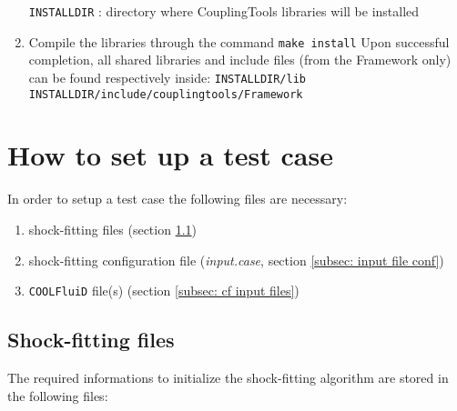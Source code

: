 \documentclass[11pt,a4paper,oneside]{article}
\begin{document}
\begin{enumerate}
{\hspace*{1cm} \texttt{INSTALLDIR} : directory where CouplingTools libraries will be installed
}
\item
{
Compile the libraries through the command
\newline
\newline
\hspace*{1cm} \texttt{make install}
\newline
\newline
Upon successful completion, all shared libraries and include files (from the Framework only) can be found respectively inside:
\newline
\newline
\hspace*{1cm} \texttt{INSTALLDIR/lib  \quad INSTALLDIR/include/couplingtools/Framework}
}
\end{enumerate}

\section{How to set up a test case}
\label{sec:setup test case}

In order to setup a test case the following files are necessary:

\begin{enumerate}
\item{shock-fitting files (section \ref{subsec: sf input files})}
\item{shock-fitting configuration file (\textit{input.case}, section \ref{subsec: input file conf}) }
\item{\texttt{COOLFluiD} file(s) (section \ref{subsec: cf input files})}
\end{enumerate}

\subsection{Shock-fitting files}
\label{subsec: sf input files}
The required informations to initialize the shock-fitting algorithm are stored in the following files:
\end{document}

